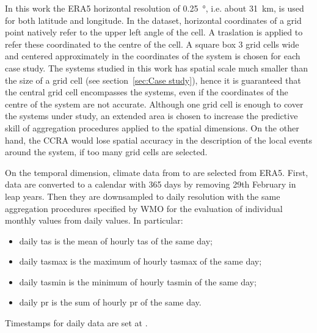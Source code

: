 In this work the ERA5 horizontal resolution of \qty{0.25}{\degree}, i.e. about \qty{31}{\kilo\metre}, is used for both latitude and longitude. In the dataset, horizontal coordinates of a grid point natively refer to the upper left angle of the cell. A traslation is applied to refer these coordinated to the centre of the cell. A square box 3 grid cells wide and centered approximately in the coordinates of the system is chosen for each case study. The systems studied in this work has spatial scale much smaller than the size of a grid cell (see section~\ref{sec:Case study}), hence it is guaranteed that the central grid cell encompasses the systems, even if the coordinates of the centre of the system are not accurate. Although one grid cell is enough to cover the systems under study, an extended area is chosen to increase the predictive skill of aggregation procedures applied to the spatial dimensions. On the other hand, the \gls{CCRA} would lose spatial accuracy in the description of the local events around the system, if too many grid cells are selected.

On the temporal dimension, climate data from  to  are selected from ERA5. First, data are converted to a calendar with 365 days by removing 29th February in leap years. Then they are downsampled to daily resolution with the same aggregation procedures specified by \gls{WMO} for the evaluation of individual monthly values from daily values.\cite[5]{2017WorldMeteorologicalOrganizationWMOWMOGuidelines} In particular:
\begin{itemize}
  \item daily \glsdesc{tas} is the mean of hourly \glsdesc{tas} of the same day;
  \item daily \glsdesc{tasmax} is the maximum of hourly \glsdesc{tasmax} of the same day;
  \item daily \glsdesc{tasmin} is the minimum of hourly \glsdesc{tasmin} of the same day;
  \item daily \glsdesc{pr} is the sum of hourly \glsdesc{pr} of the same day.
\end{itemize}
Timestamps for daily data are set at .



